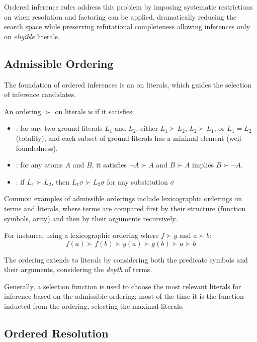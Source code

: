 Ordered inference rules address this problem by imposing systematic restrictions on when resolution and factoring can be applied, dramatically reducing the search space while preserving refutational completeness allowing inferences only on \emph{eligible} literals.

\subsection{Admissible Ordering}\label{subsec:admissible-ordering}

The foundation of ordered inferences is an  on literals, which guides the selection of inference candidates.

An ordering \(\succ\) on literals is  if it satisfies:
\begin{itemize}
    \item {}: for any two ground literals \(L_1\) and \(L_2\), either \(L_1 \succ L_2\), \(L_2 \succ L_1\), or \(L_1 = L_2\) (totality), and each subset of ground literals has a minimal element (well-foundedness).
    \item {}: for any atoms \(A\) and \(B\), it satisfies \(\neg A \succ A\) and \(B \succ A\) implies \(B \succ \neg A\).
    \item {}: if \(L_1 \succ L_2\), then \(L_1\sigma \succ L_2\sigma\) for any substitution \(\sigma\)
\end{itemize}

Common examples of admissible orderings include lexicographic orderings on terms and literals, where terms are compared first by their structure (function symbols, arity) and then by their arguments recursively.

For instance, using a lexicographic ordering where \(f \succ g\) and \(a \succ b\):
\[f(a) \succ f(b) \succ g(a) \succ g(b) \succ a \succ b\]

The ordering extends to literals by considering both the predicate symbols and their arguments, considering the \emph{depth} of terms.

Generally, a selection function is used to choose the most relevant literals for inference based on the admissible ordering; most of the time it is the function inducted from the ordering, selecting the maximal literals.

\subsection{Ordered Resolution}\label{subsec:ordered-resolution}

